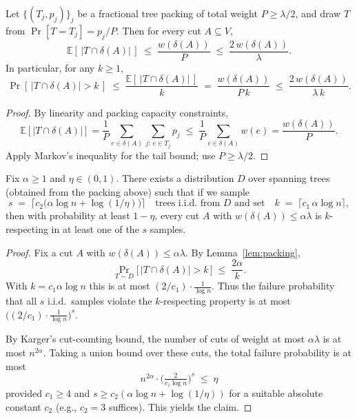 \documentclass[11pt,letterpaper]{article}
\begin{document}
\begin{lemma}\label{lem:packing}
Let $\{(T_j,p_j)\}_j$ be a fractional tree packing of total weight $P\ge \lambda/2$,
and draw $T$ from $\Pr[T=T_j]=p_j/P$.
Then for every cut $A\subseteq V$,
\[
\mathbb{E}\!\left[\,|T\cap\delta(A)|\,\right]
\;\le\;\frac{w(\delta(A))}{P}\;\le\;\frac{2\,w(\delta(A))}{\lambda}.
\]
In particular, for any $k\ge 1$,
\[
\Pr\!\left[\,|T\cap\delta(A)|>k\,\right]\;\le\;\frac{\mathbb{E}[\,|T\cap\delta(A)|\,]}{k}
\;=\;\frac{w(\delta(A))}{P\,k}\;\le\;\frac{2\,w(\delta(A))}{\lambda\,k}.
\]
\end{lemma}

\begin{proof}
By linearity and packing capacity constraints,
\[
\mathbb{E}[|T\cap\delta(A)|]
= \frac{1}{P}\sum_{e\in\delta(A)}\!\sum_{j:\,e\in T_j}\!p_j
\;\le\;\frac{1}{P}\sum_{e\in\delta(A)} w(e)
=\frac{w(\delta(A))}{P}.
\]
Apply Markov's inequality for the tail bound; use $P\ge \lambda/2$.
\end{proof}

\begin{theorem}\label{thm:thm3}
Fix $\alpha\ge 1$ and $\eta\in(0,1)$. There exists a distribution $D$ over
spanning trees (obtained from the packing above) such that if we sample
\[
s \;=\; \Big\lceil c_2\big(\alpha\log n + \log(1/\eta)\big)\Big\rceil
\quad\text{trees i.i.d.\ from $D$ and set}\quad
k \;=\; \Big\lceil c_1\,\alpha\log n\Big\rceil,
\]
then with probability at least $1-\eta$, every cut $A$ with
$w(\delta(A))\le \alpha\lambda$ is $k$-respecting in at least one of the $s$ samples.
\end{theorem}

\begin{proof}
Fix a cut $A$ with $w(\delta(A))\le \alpha\lambda$. By Lemma~\ref{lem:packing},
\[
\Pr_{T\sim D}\!\big[\,|T\cap\delta(A)|>k\,\big] \;\le\; \frac{2\alpha}{k}.
\]
With $k=c_1\alpha\log n$ this is at most $(2/c_1)\cdot \frac{1}{\log n}$. Thus
the failure probability that all $s$ i.i.d.\ samples violate the $k$-respecting
property is at most $\big((2/c_1)\cdot \frac{1}{\log n}\big)^{s}$.

By Karger’s cut-counting bound, the number of cuts of weight at most $\alpha\lambda$
is at most $n^{2\alpha}$. Taking a union bound over these cuts, the total failure
probability is at most
\[
n^{2\alpha}\cdot \Big(\tfrac{2}{c_1\log n}\Big)^{s}
\;\le\; \eta
\]
provided $c_1\ge 4$ and
$s \ge c_2(\alpha\log n + \log(1/\eta))$ for a suitable absolute constant $c_2$
(e.g., $c_2=3$ suffices). This yields the claim.
\end{proof}
\end{document}
